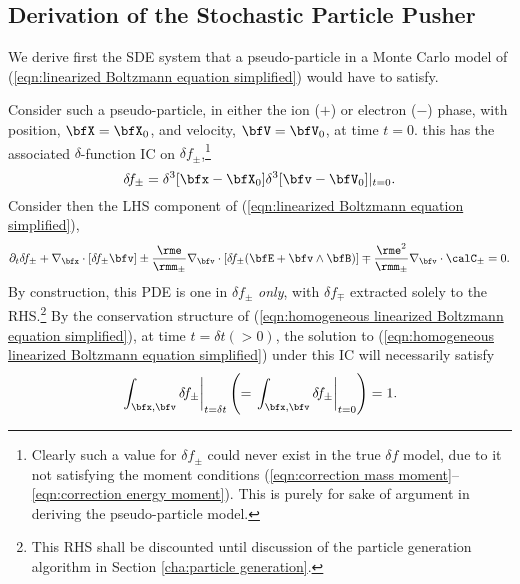 \subsection*{Derivation of the Stochastic Particle Pusher}
    We derive first the SDE system that a pseudo-particle in a Monte Carlo model of (\ref{eqn:linearized Boltzmann equation simplified}) would have to satisfy.


    Consider such a pseudo-particle, in either the ion ($+$) or electron ($-$) phase, with position, $\bfX  =  \bfX_{0}$, and velocity, $\bfV  =  \bfV_{0}$, at time $t  =  0$. this has the associated $\delta$-function IC on $\delta\!f_{\pm}$,\footnote{Clearly such a value for $\delta\!f_{\pm}$ could never exist in the true $\delta\!f$ model, due to it not satisfying the moment conditions (\ref{eqn:correction mass moment}--\ref{eqn:correction energy moment}). This is purely for sake of argument in deriving the pseudo-particle model.}
    \begin{equation}
        \delta\!f_{\pm}  =  \delta^{3}[\bfx - \bfX_{0}]\delta^{3}[\bfv - \bfV_{0}]|_{t = 0}.
    \end{equation}
    Consider then the LHS component of (\ref{eqn:linearized Boltzmann equation simplified}),
    \begin{equation}\label{eqn:homogeneous linearized Boltzmann equation simplified}
        \partial_{t}\delta\!f_{\pm} + \nabla_{\bfx}\cdot[\delta\!f_{\pm}\bfv] \pm \frac{\rme}{\rmm_{\pm}}\nabla_{\bfv}\cdot[\delta\!f_{\pm}(\bfE + \bfv\wedge\bfB)] \mp \frac{\rme^{2}}{\rmm_{\pm}}\nabla_{\bfv}\cdot\calC_{\pm}  =  0.
    \end{equation}
    By construction, this PDE is one in $\delta\!f_{\pm}$ \emph{only}, with $\delta\!f_{\mp}$ extracted solely to the RHS.\footnote{This RHS shall be discounted until discussion of the particle generation algorithm in Section \ref{cha:particle generation}.} By the conservation structure of (\ref{eqn:homogeneous linearized Boltzmann equation simplified}), at time $t = \delta t (> 0)$, the solution to (\ref{eqn:homogeneous linearized Boltzmann equation simplified}) under this IC will necessarily satisfy
    \begin{equation}
        \left.\int_{\bfx, \bfv}\delta\!f_{\pm}\right|_{t = \delta t}  \left(=  \left.\int_{\bfx, \bfv}\delta\!f_{\pm}\right|_{t = 0}\right)  =  1.
    \end{equation}
